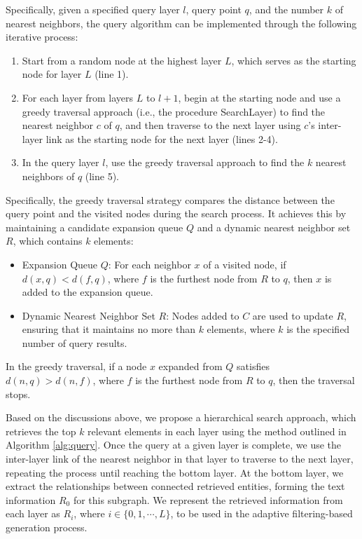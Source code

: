 Specifically, given a specified query layer $l$, query point $q$, and the number $k$ of nearest neighbors, the query algorithm can be implemented through the following iterative process:
\begin{enumerate}
    \item Start from a random node at the highest layer $L$, which serves as the starting node for layer $L$ (line 1).
    
    \item For each layer from layers $L$ to $l+1$, begin at the starting node and use a greedy traversal approach (i.e., the procedure SearchLayer) to find the nearest neighbor $c$ of $q$, and then traverse to the next layer using $c$'s inter-layer link as the starting node for the next layer (lines 2-4).
    
    \item In the query layer $l$, use the greedy traversal approach to find the $k$ nearest neighbors of $q$ (line 5).
\end{enumerate}

Specifically, the greedy traversal strategy compares the distance between the query point and the visited nodes during the search process.
% 
It achieves this by maintaining a candidate expansion queue $Q$ and a dynamic nearest neighbor set $R$, which contains $k$ elements:

\begin{itemize}
    \item Expansion Queue $Q$: For each neighbor $x$ of a visited node, if $d(x,q)<d(f,q)$, where $f$ is the furthest node from $R$ to $q$, then $x$ is added to the expansion queue.
    \item Dynamic Nearest Neighbor Set $R$: Nodes added to $C$ are used to update $R$, ensuring that it maintains no more than $k$ elements, where $k$ is the specified number of query results.
\end{itemize}

In the greedy traversal, if a node $x$ expanded from $Q$ satisfies $
d(n,q)>d(n,f)$, where $f$ is the furthest node from $R$ to $q$, then the traversal stops.


Based on the discussions above, we propose a hierarchical search approach, which retrieves the top $k$ relevant elements in each layer using the method outlined in Algorithm \ref{alg:query}.
% 
% 
Once the query at a given layer is complete, we use the inter-layer link of the nearest neighbor in that layer to traverse to the next layer, repeating the process until reaching the bottom layer.
% 
At the bottom layer, we extract the relationships between connected retrieved entities, forming the text information $R_0$ for this subgraph.
% 
We represent the retrieved information from each layer as $R_i$, where $i \in \{0,1,\cdots, L\}$, to be used in the adaptive filtering-based generation process.

